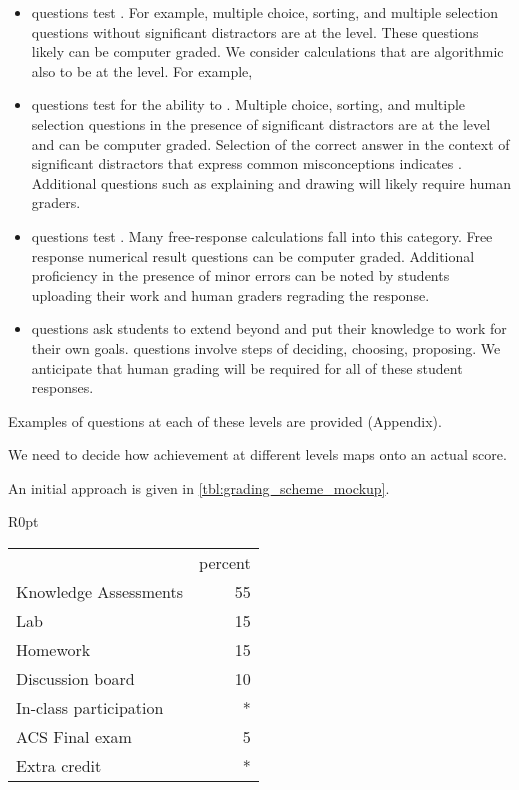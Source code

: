 \documentclass[10pt,letterpaper]{article}
\begin{document}
\begin{itemize}
\item \Recall questions test . For example, multiple choice, sorting, and multiple selection questions without significant distractors are at the \recall level. These questions likely can be computer graded. We consider calculations that are algorithmic also to be at the \recall level. For example,  
\item \Comprehension questions test for the ability to . Multiple choice, sorting,  and multiple selection questions in the presence of  significant distractors are at the \comprehension level and can be computer graded. Selection of the correct answer in the context of significant distractors that express common misconceptions indicates \comprehension. Additional questions such as explaining and drawing will likely require human graders.
\item \Analysis questions test . Many free-response calculations fall into this category. Free response numerical result questions can be computer graded. Additional proficiency in the presence of minor errors can be noted by students uploading their work and human graders regrading the response.
\item \Use questions ask students to extend beyond \analysis and put their knowledge to work for their own goals. \Use questions involve steps of deciding, choosing, proposing. We anticipate that human grading will be required for all of these student responses.
\end{itemize}
Examples of questions at each of these levels are provided (Appendix).
%

 We need to decide how achievement at different levels maps onto an actual score. 

An initial approach is given in \cref{tbl:grading_scheme_mockup}.
\begin{wraptable}{R}{0pt}
\begin{tabular}{lr}
&percent\\
Knowledge Assessments & 55\\
Lab  & 15\\
Homework  & 15\\
Discussion board  & 10\\
In-class participation  & *\\ 
ACS Final exam  & 5\\
Extra credit  & *
\end{tabular}
\caption{\label{tbl:grading_scheme_mockup}
The revised point structure will be quite similar to the existing point distribution.} 
\end{wraptable}
\end{document}
